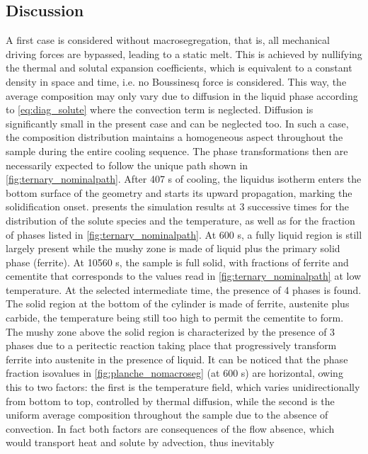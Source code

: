 \subsection{Discussion}
A first case is considered without macrosegregation, that is, all mechanical driving forces are bypassed, leading to a static melt. 
This is achieved by nullifying the thermal and solutal expansion coefficients, which is equivalent to a constant density in space 
and time, i.e. no Boussinesq force is considered. This way, the average composition may only vary due to diffusion in the liquid 
phase according to \cref{eq:diag_solute} where the convection term is neglected. Diffusion is significantly small in the present case and can be 
neglected too. In such a case, the composition distribution maintains a homogeneous aspect throughout the sample during the entire 
cooling sequence. The phase transformations then are necessarily expected to follow the unique path shown in \cref{fig:ternary_nominalpath}. After 407 s 
of cooling, the liquidus isotherm enters the bottom surface of the geometry and starts its upward propagation, marking the solidification 
onset.  presents the simulation results at 3 successive times for the distribution of the solute species and the temperature, as 
well as for the fraction of phases listed in \cref{fig:ternary_nominalpath}. At 600 s, a fully liquid region is still largely present while the mushy zone is 
made of liquid plus the primary solid phase (ferrite). At \num{10560} s, the sample is full solid, with fractions of ferrite and cementite that 
corresponds to the values read in \cref{fig:ternary_nominalpath} at low temperature. At the selected intermediate time, the presence of 4 phases is found. The 
solid region at the bottom of the cylinder is made of ferrite, austenite plus carbide, the temperature being still too high to permit the 
cementite to form. The mushy zone above the solid region is characterized by the presence of 3 phases due to a peritectic reaction taking 
place that progressively transform ferrite into austenite in the presence of liquid. It can be noticed that the phase fraction isovalues 
in \cref{fig:planche_nomacroseg} (at 600 s) are horizontal, owing this to two factors: the first is the temperature field, which varies unidirectionally from 
bottom to top, controlled by thermal diffusion, while the second is the uniform average composition throughout the sample due to the absence 
of convection. In fact both factors are consequences of the flow absence, which would transport heat and solute by advection, thus inevitably 
